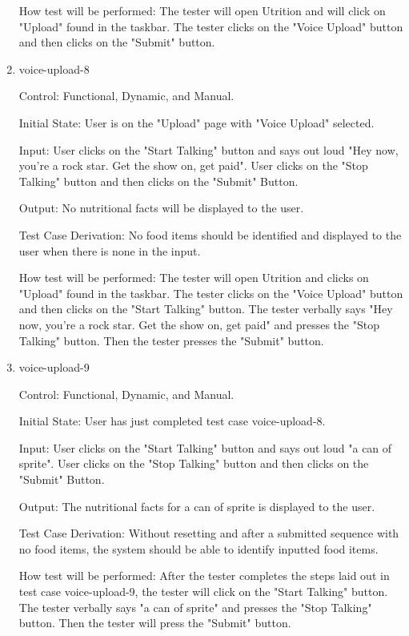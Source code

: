 \documentclass[12pt, titlepage]{article}
\begin{document}
\begin{enumerate}
	How test will be performed: The tester will open Utrition and will click on "Upload" found in the taskbar. The tester clicks on the "Voice Upload" button and then clicks on the "Submit" button.
	
	\item{voice-upload-8\\}
	
	Control: Functional, Dynamic, and Manual.
	
	Initial State: User is on the "Upload" page with "Voice Upload" selected.
	
	Input: User clicks on the "Start Talking" button and says out loud "Hey now, you're a rock star. Get the show on, get paid". User clicks on the "Stop Talking" button and then clicks on the "Submit" Button.
	
	Output: No nutritional facts will be displayed to the user.
	
	Test Case Derivation: No food items should be identified and displayed to the user when there is none in the input.
	
	How test will be performed: The tester will open Utrition and clicks on "Upload" found in the taskbar. The tester clicks on the "Voice Upload" button and then clicks on the "Start Talking" button. The tester verbally says "Hey now, you're a rock star. Get the show on, get paid" and presses the "Stop Talking" button. Then the tester presses the "Submit" button.
	
	\item{voice-upload-9\\}
	
	Control: Functional, Dynamic, and Manual.
	
	Initial State: User has just completed test case voice-upload-8.
	
	Input: User clicks on the "Start Talking" button and says out loud "a can of sprite". User clicks on the "Stop Talking" button and then clicks on the "Submit" Button.
	
	Output: The nutritional facts for a can of sprite is displayed to the user.
	
	Test Case Derivation: Without resetting and after a submitted sequence with no food items, the system should be able to identify inputted food items.
	
	How test will be performed: After the tester completes the steps laid out in test case voice-upload-9, the tester will click on the "Start Talking" button. The tester verbally says "a can of sprite" and presses the "Stop Talking" button. Then the tester will press the "Submit" button.
	

\end{enumerate}
\end{document}
